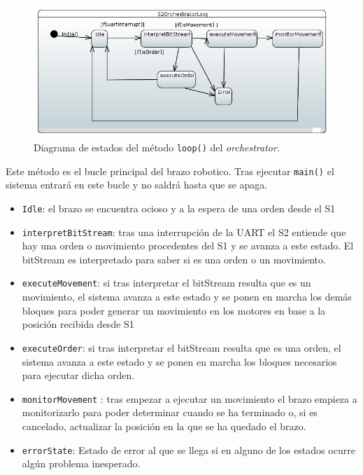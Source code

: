 \begin{figure}[H]
    \centering
    \includegraphics[width=1\linewidth]{pictures/S2OrchestratorLoop.PNG}
    \caption{Diagrama de estados del método \texttt{loop()} del \textit{orchestrator}.}
    \label{fig:fun_loop_orchestrator}
\end{figure}

Este método es el bucle principal del brazo robotico. Tras ejecutar \texttt{main()} el sistema entrará en este bucle y no saldrá hasta que se apaga.

\begin{itemize}
    \item \texttt{Idle}: el brazo se encuentra ocioso y a la espera de una orden desde el \ac{S1}
    \item \texttt{interpretBitStream}: tras una interrupción de la UART el \ac{S2} entiende que hay una orden o movimiento procedentes del \ac{S1} y se avanza a este estado. El bitStream es interpretado para saber si es una orden o un movimiento.
    \item \texttt{executeMovement}: si tras interpretar el bitStream resulta que es un movimiento, el sistema avanza a este estado y se ponen en marcha los demás bloques para poder generar un movimiento en los motores en base a la posición recibida desde \ac{S1}
    \item \texttt{executeOrder}: si tras interpretar el bitStream resulta que es una orden, el sistema avanza a este estado y se ponen en marcha los bloques necesarios para ejecutar dicha orden.
    \item \texttt{monitorMovement} : tras empezar a ejecutar un movimiento el brazo empieza a monitorizarlo para poder determinar cuando se ha terminado o, si es cancelado, actualizar la posición en la que se ha quedado el brazo.
    \item \texttt{errorState}: Estado de error al que se llega si en alguno de los estados ocurre algún problema inesperado. 
    
    
\end{itemize}

